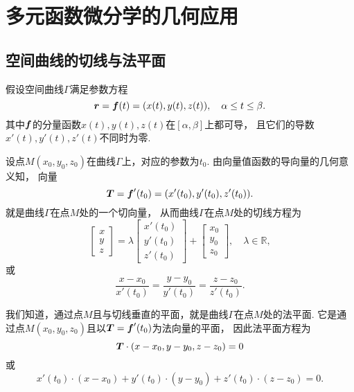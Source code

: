 \section{多元函数微分学的几何应用}
\subsection{空间曲线的切线与法平面}
假设空间曲线\(\Gamma\)满足参数方程 
\[
	\boldsymbol{r}
	= \boldsymbol{f}(t)
	= (x(t),y(t),z(t)),
	\quad \alpha \leq t \leq \beta.
\]
其中\(\boldsymbol{f}\)的分量函数\(x(t),y(t),z(t)\)在\([\alpha,\beta]\)上都可导，
且它们的导数\(x'(t),y'(t),z'(t)\)不同时为零.

设点\(M(x_0,y_0,z_0)\)在曲线\(\Gamma\)上，对应的参数为\(t_0\).
由向量值函数的导向量的几何意义知，
向量\begin{equation}
	\boldsymbol{T}
	= \boldsymbol{f}'(t_0)
	= (x'(t_0),y'(t_0),z'(t_0)).
\end{equation}
就是曲线\(\Gamma\)在点\(M\)处的一个切向量，
从而曲线\(\Gamma\)在点\(M\)处的切线方程为
\begin{equation}
	\begin{bmatrix}
		x \\
		y \\
		z
	\end{bmatrix}
	= \lambda \begin{bmatrix}
		x'(t_0) \\
		y'(t_0) \\
		z'(t_0)
	\end{bmatrix}
	+ \begin{bmatrix}
		x_0 \\
		y_0 \\
		z_0
	\end{bmatrix},
	\quad \lambda\in\mathbb{R},
\end{equation}
或
\begin{equation}\label{equation:多元函数微分学的几何应用.曲线的切线方程}
	\frac{x-x_0}{x'(t_0)}
	=\frac{y-y_0}{y'(t_0)}
	=\frac{z-z_0}{z'(t_0)}.
\end{equation}

我们知道，通过点\(M\)且与切线垂直的平面，就是曲线\(\Gamma\)在点\(M\)处的法平面.
它是通过点\(M(x_0,y_0,z_0)\)且以\(\boldsymbol{T}=\boldsymbol{f}'(t_0)\)为法向量的平面，
因此法平面方程为\begin{equation}
	\boldsymbol{T}\cdot(x-x_0,y-y_0,z-z_0)=0
\end{equation}
或\begin{equation}
	x'(t_0) \cdot (x-x_0) + y'(t_0) \cdot (y-y_0) + z'(t_0) \cdot (z-z_0) = 0.
\end{equation}

